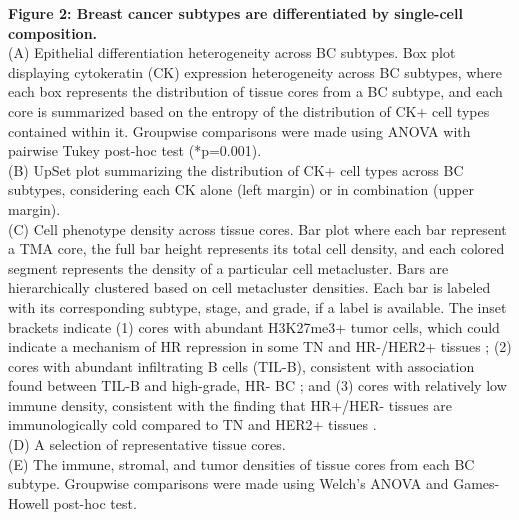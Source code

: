 \documentclass[preprint,review,3p,12pt]{elsarticle}
\begin{document}
\noindent 
\textbf{Figure 2: Breast cancer subtypes are differentiated by single-cell composition.} \\
(A) Epithelial differentiation heterogeneity across BC subtypes. Box plot displaying cytokeratin (CK) expression heterogeneity across BC subtypes, where each box represents the distribution of tissue cores from a BC subtype, and each core is summarized based on the entropy of the distribution of CK+ cell types contained within it. Groupwise comparisons were made using ANOVA with pairwise Tukey post-hoc test (*p=0.001).\\
(B) UpSet plot summarizing the distribution of CK+ cell types across BC subtypes, considering each CK alone (left margin) or in combination (upper margin).\\
(C) Cell phenotype density across tissue cores. Bar plot where each bar represent a TMA core, the full bar height represents its total cell density, and each colored segment represents the density of a particular cell metacluster. Bars are hierarchically clustered based on cell metacluster densities. Each bar is labeled with its corresponding subtype, stage, and grade, if a label is available. The inset brackets indicate (1) cores with abundant H3K27me3+ tumor cells, which could indicate a mechanism of HR repression in some TN and HR-/HER2+ tissues \cite{histone2016}; (2) cores with abundant infiltrating B cells (TIL-B), consistent with association found between TIL-B and high-grade, HR- BC \cite{bcell2019}; and (3) cores with relatively low immune density, consistent with the finding that HR+/HER- tissues are immunologically cold compared to TN and HER2+ tissues \cite{pdl1a2015,pdl1b2015}.\\
(D) A selection of representative tissue cores.\\
(E) The immune, stromal, and tumor densities of tissue cores from each BC subtype. Groupwise comparisons were made using Welch's ANOVA and Games-Howell post-hoc test.
\end{document}
